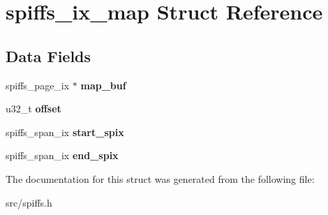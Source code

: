\hypertarget{structspiffs__ix__map}{}\section{spiffs\+\_\+ix\+\_\+map Struct Reference}
\label{structspiffs__ix__map}
\subsection*{Data Fields}
\begin{DoxyCompactItemize}
\item 
\mbox{\label{structspiffs__ix__map_a16c980d6657eb2916fcede33bd062004}} 
spiffs\+\_\+page\+\_\+ix $\ast$ {\bfseries map\+\_\+buf}
\item 
\mbox{\label{structspiffs__ix__map_a1a51b6b7e57415165a7c9079894a1a88}} 
u32\+\_\+t {\bfseries offset}
\item 
\mbox{\label{structspiffs__ix__map_a34ffaa7208e9495eaab9f6271f912995}} 
spiffs\+\_\+span\+\_\+ix {\bfseries start\+\_\+spix}
\item 
\mbox{\label{structspiffs__ix__map_af82f3c0899fe830e951ef796bee8b348}} 
spiffs\+\_\+span\+\_\+ix {\bfseries end\+\_\+spix}
\end{DoxyCompactItemize}


The documentation for this struct was generated from the following file\+:\begin{DoxyCompactItemize}
\item 
src/spiffs.\+h\end{DoxyCompactItemize}
